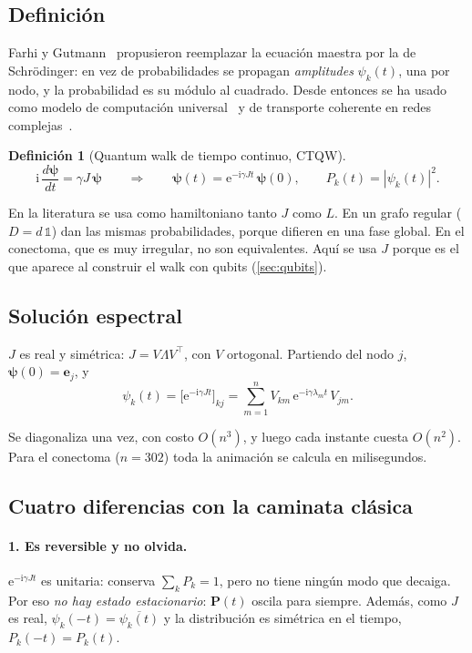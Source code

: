 \documentclass[11pt,a4paper]{article}
\newcommand{\e}{\mathrm{e}}
\newcommand{\ii}{\mathrm{i}}
\theoremstyle{plain}
\theoremstyle{definition}
\newtheorem{definicion}[proposicion]{Definición}
\theoremstyle{remark}
\begin{document}
\subsection{Definición}

Farhi y Gutmann~\cite{farhi1998} propusieron reemplazar la ecuación maestra por la de Schrödinger: en vez de probabilidades se propagan \emph{amplitudes} $\psi_k(t)$, una por nodo, y la probabilidad es su módulo al cuadrado. Desde entonces se ha usado como modelo de computación universal~\cite{childs2009} y de transporte coherente en redes complejas~\cite{mulken2011}.

\begin{definicion}[Quantum walk de tiempo continuo, CTQW]
\begin{equation}
\ii\,\frac{d\bm\psi}{dt}=\gamma J\,\bm\psi
\qquad\Longrightarrow\qquad
\bm\psi(t)=\e^{-\ii\gamma Jt}\,\bm\psi(0),
\qquad
P_k(t)=|\psi_k(t)|^2 .
\label{eq:ctqw-def}
\end{equation}
\end{definicion}

En la literatura se usa como hamiltoniano tanto $J$ como $L$. En un grafo regular ($D=d\,\mathbb 1$) dan las mismas probabilidades, porque difieren en una fase global. En el conectoma, que es muy irregular, no son equivalentes. Aquí se usa $J$ porque es el que aparece al construir el walk con qubits (\cref{sec:qubits}).

\subsection{Solución espectral}

$J$ es real y simétrica: $J=V\Lambda V^\top$, con $V$ ortogonal. Partiendo del nodo $j$, $\bm\psi(0)=\bm e_j$, y
\begin{equation}
\psi_k(t)=\bigl[\e^{-\ii\gamma Jt}\bigr]_{kj}=\sum_{m=1}^nV_{km}\,\e^{-\ii\gamma\lambda_mt}\,V_{jm}.
\label{eq:espectral}
\end{equation}

Se diagonaliza una vez, con costo $O(n^3)$, y luego cada instante cuesta $O(n^2)$. Para el conectoma ($n=302$) toda la animación se calcula en milisegundos.

\subsection{Cuatro diferencias con la caminata clásica}

\paragraph{1. Es reversible y no olvida.} $\e^{-\ii\gamma Jt}$ es unitaria: conserva $\sum_kP_k=1$, pero no tiene ningún modo que decaiga. Por eso \emph{no hay estado estacionario}: $\bm P(t)$ oscila para siempre. Además, como $J$ es real, $\psi_k(-t)=\overline{\psi_k(t)}$ y la distribución es simétrica en el tiempo, $P_k(-t)=P_k(t)$.
\end{document}
